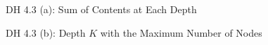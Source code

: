 
\begin{frame}{}
  \begin{exampleblock}{DH 4.3 (a): Sum of Contents at Each Depth}
  \end{exampleblock}

  \pause
  \vspace{-0.80cm}
\end{frame}

\begin{frame}{}
  
\end{frame}

\begin{frame}{}
  \begin{exampleblock}{DH 4.3 (b): Depth $K$ with the Maximum Number of Nodes}
  \end{exampleblock}

  \pause
  \vspace{-0.80cm}
\end{frame}

\begin{frame}{}
  
\end{frame}
